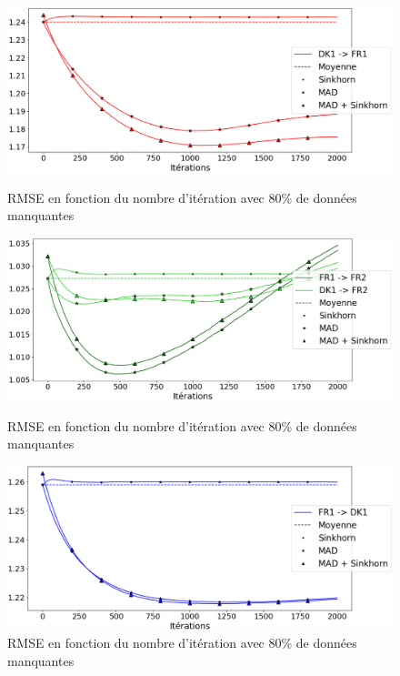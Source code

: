 \documentclass[acmsmall, natbib=false, nonacm]{acmart}
\begin{document}
\begin{figure}[H]
    \begin{minipage}[b]{0.4\linewidth}
		\centering \includegraphics[scale=0.14]{images/80_biais_FR1.png}
		\caption{RMSE en fonction du nombre d'itération avec 80\% de données manquantes}
	\end{minipage}\hfill
    \begin{minipage}[b]{0.4\linewidth}
		\centering \includegraphics[scale=0.14]{images/80_biais_FR2.png}
		\caption{RMSE en fonction du nombre d'itération avec 80\% de données manquantes}
	\end{minipage}\hfill
    \begin{minipage}[b]{0.4\linewidth}
		\centering \includegraphics[scale=0.14]{images/80_biais_DK1.png}
		\caption{RMSE en fonction du nombre d'itération avec 80\% de données manquantes}
	\end{minipage}\hfill

\end{figure}
\end{document}
